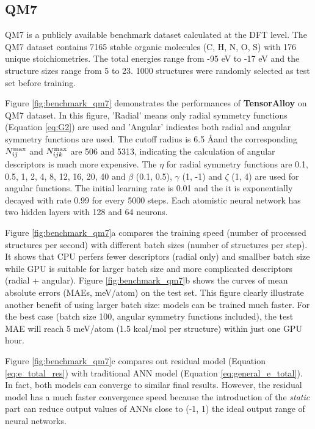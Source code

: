 \documentclass[prb,preprint]{revtex4-2}
\begin{document}
\subsection{QM7}

QM7\cite{QM7_1,QM7_2} is a publicly available benchmark dataset calculated at 
the DFT level. The QM7 dataset contains 7165 stable organic molecules 
(C, H, N, O, S) with 176 unique stoichiometries. The total energies range from 
-95 eV to -17 eV and the structure sizes range from 5 to 23. 1000 structures 
were randomly selected as test set before training.

Figure \ref{fig:benchmark_qm7} demonstrates the performances of 
\textbf{TensorAlloy} on QM7 dataset. In this figure, 'Radial' means only radial 
symmetry functions (Equation \ref{eq:G2}) are used and 'Angular' indicates both 
radial and angular symmetry functions are used. The cutoff radius is 6.5 \AA and
the corresponding $N_{ij}^{\mathrm{max}}$ and $N_{ijk}^{\mathrm{max}}$ are 506 and 5313, indicating the 
calculation of angular descriptors is much more expensive.
The $\eta$ for radial symmetry functions are 0.1, 0.5, 1, 2, 4, 8, 12, 16, 20, 
40 and $\beta$ (0.1, 0.5), $\gamma$ (1, -1) and $\zeta$ (1, 4) are used for
angular functions. The initial learning rate is 0.01 and the it is exponentially 
decayed with rate 0.99 for every 5000 steps. Each atomistic neural network has
two hidden layers with 128 and 64 neurons.

Figure \ref{fig:benchmark_qm7}a compares the training speed (number of processed 
structures per second) with different batch sizes (number of structures per 
step). It shows that CPU perfers fewer descriptors (radial only) and smallber 
batch size while GPU is suitable for larger batch size and more complicated 
descriptors (radial + angular). 
Figure \ref{fig:benchmark_qm7}b shows the curves of mean absolute errors 
(MAEs, meV/atom) on the test set. This figure clearly illustrate another benefit 
of using larger batch size: models can be trained much faster. For the best case 
(batch size 100, angular symmetry functions included), the test MAE will reach 5 
meV/atom (1.5 kcal/mol per structure) within just one GPU hour. 

Figure \ref{fig:benchmark_qm7}c compares out residual model (Equation 
\ref{eq:e_total_res}) with traditional ANN model (Equation 
\ref{eq:general_e_total}). In fact, both models can converge to similar final 
results. However, the residual model has a much faster convergence speed because 
the introduction of the \textit{static} part can reduce output values of ANNs
close to (-1, 1) \textemdash the ideal output range of neural networks.
\end{document}
